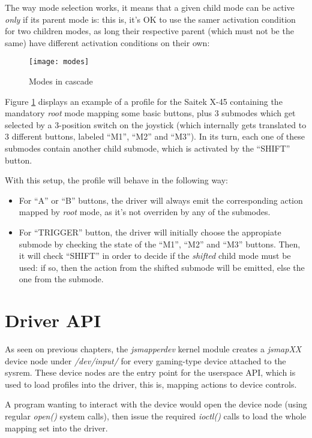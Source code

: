 The way mode selection works, it means that a given child mode can be active \emph{only} if its parent mode is: this is, it's OK to use the samer activation condition for two children modes, as long their respective parent (which must not be the same) have different activation conditions on their own:

\begin{figure}[htb]
\centering
\texttt{[image: modes]}
\caption{Modes in cascade}
\label{fig:modes}
\end{figure}

Figure \ref{fig:modes} displays an example of a profile for the Saitek X-45 containing the mandatory \emph{root} mode mapping some basic buttons, plus 3 submodes which get selected by a 3-position switch on the joystick (which internally gets translated to 3 different buttons, labeled ``M1'', ``M2'' and ``M3''). In its turn, each one of these submodes contain another child submode, which is activated by the ``SHIFT'' button.

With this setup, the profile will behave in the following way:
\begin{itemize}
	\item For ``A'' or ``B'' buttons, the driver will always emit the corresponding action mapped by \emph{root} mode, as it's not overriden by any of the submodes.
	\item For ``TRIGGER'' button, the driver will initially choose the appropiate submode by checking the state of the ``M1'', ``M2'' and ``M3'' buttons. Then, it will check ``SHIFT'' in order to decide if the \emph{shifted} child mode must be used: if so, then the action from the shifted submode will be emitted, else the one from the submode.
\end{itemize}


\section{Driver API}
As seen on previous chapters, the \emph{jsmapperdev} kernel module creates a \emph{jsmapXX} device node under \emph{/dev/input/} for every gaming-type device attached to the sysrem. These device nodes are the entry point for the userspace API, which is used to load profiles into the driver, this is, mapping actions to device controls.

A program wanting to interact with the device would open the device node (using regular \emph{open()} system calls), then issue the required \emph{ioctl()} calls to load the whole mapping set into the driver.


